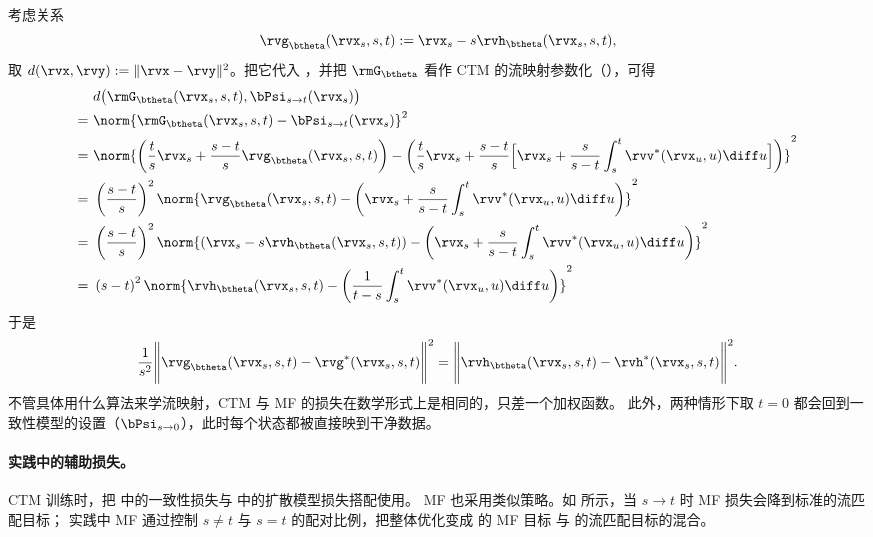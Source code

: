 考虑关系
\[
\rvg_\btheta(\rvx_s,s,t) := \rvx_s - s \rvh_\btheta(\rvx_s,s,t),
\]
取 $d(\rvx,\rvy):=\|\rvx-\rvy\|^2$。把它代入 ，并把 $\rmG_\btheta$ 看作 CTM 的流映射参数化（），可得
\begin{align} &~d\big(\rmG_\btheta(\rvx_s,s,t), \bPsi_{s\to t}(\rvx_s)\big) \notag \\ = &~\norm{\rmG_\btheta(\rvx_s,s,t) - \bPsi_{s\to t}(\rvx_s)}^2 \notag \\ = &~\norm{\left(\frac{t}{s}\rvx_s + \frac{s-t}{s} \rvg_\btheta(\rvx_s,s,t)\right)-\left(\frac{t}{s}\rvx_s + \frac{s-t}{s}\Big[\rvx_s + \frac{s}{s-t}\int_s^t \rvv^*(\rvx_u,u) \diff u\Big]\right)}^2 \notag \\ = &~\left(\frac{s-t}{s}\right)^2\norm{\rvg_\btheta(\rvx_s,s,t)-\left(\rvx_s + \frac{s}{s-t}\int_s^t \rvv^*(\rvx_u,u) \diff u\right)}^2 \label{eq:g-para} \\ = &~\left(\frac{s-t}{s}\right)^2\norm{\left(\rvx_s - s \rvh_\btheta(\rvx_s,s,t)\right)-\left(\rvx_s + \frac{s}{s-t}\int_s^t \rvv^*(\rvx_u,u) \diff u\right)}^2 \notag \\ = &~\left(s-t\right)^2\norm{ \rvh_\btheta(\rvx_s,s,t)- \left(\frac{1}{t-s}\int_s^t \rvv^*(\rvx_u,u)\diff u \right)}^2 \label{eq:h-para} \end{align}
于是
\begin{align*}
\frac{1}{s^2} \Bigg\|\rvg_\btheta(\rvx_s,s,t)-\rvg^*(\rvx_s,s,t) \Bigg\|^2 = \Bigg\|\rvh_\btheta(\rvx_s,s,t)-\rvh^*(\rvx_s,s,t) \Bigg\|^2.
\end{align*}
不管具体用什么算法来学流映射，CTM 与 MF 的损失在数学形式上是相同的，只差一个加权函数。
此外，两种情形下取 $t=0$ 都会回到一致性模型的设置（$\bPsi_{s\to 0}$），此时每个状态都被直接映到干净数据。

\paragraph{实践中的辅助损失。}
CTM 训练时，把  中的一致性损失与  中的扩散模型损失搭配使用。
MF 也采用类似策略。如  所示，当 $s \to t$ 时 MF 损失会降到标准的流匹配目标；
实践中 MF 通过控制 $s \neq t$ 与 $s = t$ 的配对比例，把整体优化变成  的 MF 目标
与  的流匹配目标的混合。


